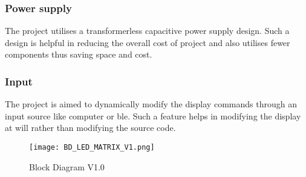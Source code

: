 \begin{multicols}{2}
			\subsubsection{Power supply}
				The project utilises a transformerless capacitive power supply design. Such a design is helpful in reducing the overall cost of project and also utilises fewer components thus saving space and cost.
				
				
			
			\subsubsection{Input}
				 The project is aimed to dynamically modify the display commands through an input source like computer or \gls{ble}. Such a feature helps in modifying the display at will rather than modifying the source code.

\end{multicols}

\begin{figure*}		
	\texttt{[image: BD\_LED\_MATRIX\_V1.png]}
	\caption{Block Diagram V1.0}	
\end{figure*}	
	
\begin{multicols}{2}

\end{multicols}	 
			
				  



